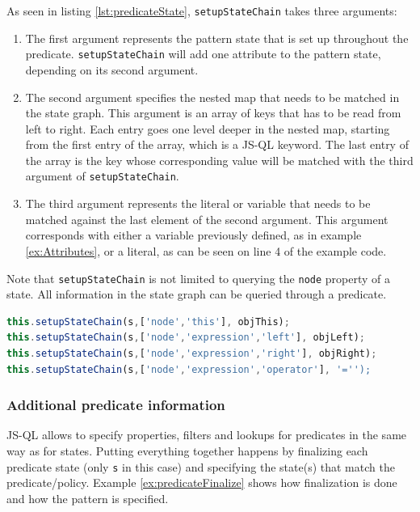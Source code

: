 \begin{exmp}
\label{ex:StateChain}
 As seen in listing \ref{lst:predicateState}, \texttt{setupStateChain} takes three arguments:
 \begin{enumerate}
 \item The first argument represents the pattern state that is set up throughout the predicate. \texttt{setupStateChain} will add one attribute to the pattern state, depending on its second argument.
 \item The second argument specifies the nested map that needs to be matched in the state graph. This argument is an array of keys that has to be read from left to right. Each entry goes one level deeper in the nested map, starting from the first entry of the array, which is a JS-QL keyword. The last entry of the array is the key whose corresponding value will be matched with the third argument of \texttt{setupStateChain}.
 \item The third argument represents the literal or variable that needs to be matched against the last element of the second argument. This argument corresponds with either a variable previously defined, as in example \ref{ex:Attributes}, or a literal, as can be seen on line 4 of the example code.
 \end{enumerate}

Note that \texttt{setupStateChain} is not limited to querying the \texttt{node} property of a state. All information in the state graph can be queried through a predicate.

\begin{lstlisting}[label={lst:predicateState},language=JavaScript, caption=State chain setup of the \texttt{assign} predicate,mathescape=true]
this.setupStateChain(s,['node','this'], objThis);
this.setupStateChain(s,['node','expression','left'], objLeft);
this.setupStateChain(s,['node','expression','right'], objRight); 
this.setupStateChain(s,['node','expression','operator'], '='');
\end{lstlisting}
\end{exmp}

\subsubsection*{Additional predicate information}
 JS-QL allows to specify properties, filters and lookups for predicates in the same way as for states. Putting everything together happens by finalizing each predicate state (only \texttt{s} in this case) and specifying the state(s) that match the predicate/policy. Example \ref{ex:predicateFinalize} shows how finalization is done and how the pattern is specified. 


